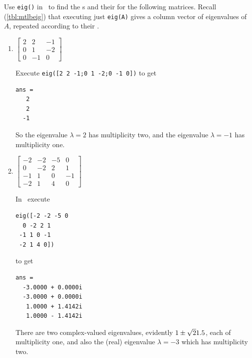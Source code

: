 \begin{example} \label{eg:multeval}
Use \verb|eig()| in \script\  to find the s and their  for the following matrices.
Recall (\autoref{tbl:mtlbeig}) that executing just \verb|eig(A)| gives a column vector of eigenvalues of~\(A\), repeated according to their . 
\begin{enumerate}
\item \(\begin{bmatrix}2&2&-1
\\0&1&-2
\\0&-1&0\end{bmatrix}\)
\begin{solution} 
Execute \verb|eig([2 2 -1;0 1 -2;0 -1 0])| to get
\setbox\ajrqrbox\hbox{}%
\marginajrbox%
\begin{verbatim}
ans =
   2
   2
  -1
\end{verbatim}
So the eigenvalue \(\lambda=2\) has multiplicity two, and the eigenvalue \(\lambda=-1\) has multiplicity one.
\end{solution}

\item \(\begin{bmatrix}-2&-2&-5&0
\\0&-2&2&1
\\-1&1&0&-1
\\-2&1&4&0\end{bmatrix}\)
\begin{solution} 
In \script\ execute
\begin{verbatim}
eig([-2 -2 -5 0
  0 -2 2 1
 -1 1 0 -1
 -2 1 4 0])
\end{verbatim}
\setbox\ajrqrbox\hbox{}%
\marginajrbox%
to get
\begin{verbatim}
ans =
  -3.0000 + 0.0000i
  -3.0000 + 0.0000i
   1.0000 + 1.4142i
   1.0000 - 1.4142i
\end{verbatim}
There are two complex-valued eigenvalues, evidently \(1\pm\sqrt21.5\), each of multiplicity one, and also the (real) eigenvalue \(\lambda=-3\) which has multiplicity two.
\end{solution}


\end{enumerate}
\end{example}
